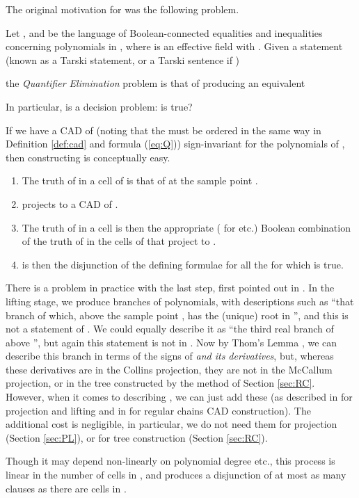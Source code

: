 \documentclass[runningheads,a4paper]{llncs}
\begin{document}
The original motivation for \cite{Collins1975} was the following problem.
\begin{problem}Let , and  be the language of Boolean-connected equalities and inequalities concerning polynomials in , where  is an effective field with  . Given a statement (known as a Tarski statement, or a Tarski sentence if )

the \emph{Quantifier Elimination} problem is that of producing an equivalent

In particular,  is a decision problem: is  true?
\end{problem}
If we have a CAD  of  (noting that the   must be ordered in the same way in Definition \ref{def:cad} and formula (\ref{eq:Q})) sign-invariant for the polynomials of , then constructing  is conceptually easy.
\begin{enumerate}
\item The truth of  in a cell  of   is that of  at the sample point .\label{first}
\item  projects to a  CAD  of .
\item The truth of  in a cell  is then the appropriate ( for  etc.) Boolean combination of the truth of  in the cells of  that project to .\label{step:bool}
\item  is then the disjunction of the defining formulae for all the  for which  is true.\label{last}
\end{enumerate}
There is a problem in practice with the last step, first pointed out in \cite{Brown1999a}. In the lifting stage, we produce branches  of polynomials, with descriptions such as ``that branch of  which, above the sample point , has the (unique) root in '', and this is not a statement of . We could equally describe it as ``the third real branch of  above '', but again this statement is not in . Now by Thom's Lemma \cite{CosteRoy1988}, we can describe this branch in terms of the signs of  \emph{and its derivatives}, but, whereas these derivatives are in the Collins projection, they are not in the McCallum projection, or in the tree constructed by the method of Section \ref{sec:RC}. However, when it comes to describing , we can just add these (as described in \cite{Brown1999a} for projection and lifting and in \cite{CM14} for regular chains CAD construction). The additional cost is negligible, in particular, we do not need them for projection (Section \ref{sec:PL}), or for tree construction (Section \ref{sec:RC}).

Though it may depend non-linearly on polynomial degree etc., this process is linear in the number of cells in , and produces a disjunction of at most as many clauses as there are cells in . 
\end{document}

